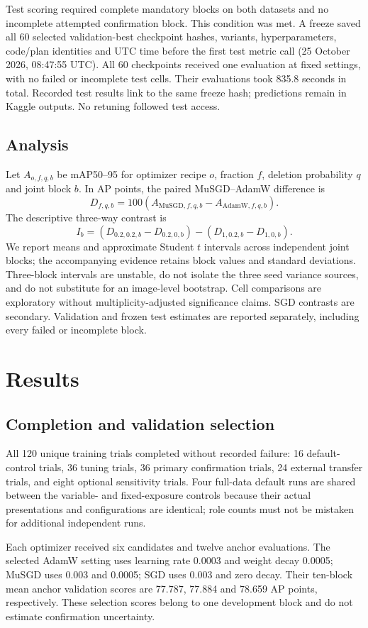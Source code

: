 \documentclass[11pt,a4paper]{article}
\begin{document}
Test scoring required complete mandatory blocks on both datasets and no incomplete attempted confirmation block. This condition was met. A freeze saved all 60 selected validation-best checkpoint hashes, variants, hyperparameters, code/plan identities and UTC time before the first test metric call (25 October 2026, 08:47:55 UTC). All 60 checkpoints received one evaluation at fixed settings, with no failed or incomplete test cells. Their evaluations took 835.8 seconds in total. Recorded test results link to the same freeze hash; predictions remain in Kaggle outputs. No retuning followed test access.

\subsection{Analysis}
Let $A_{o,f,q,b}$ be mAP50--95 for optimizer recipe $o$, fraction $f$, deletion probability $q$ and joint block $b$. In AP points, the paired MuSGD--AdamW difference is
\[
D_{f,q,b}=100(A_{\mathrm{MuSGD},f,q,b}-A_{\mathrm{AdamW},f,q,b}).
\]
The descriptive three-way contrast is
\[
I_b=(D_{0.2,0.2,b}-D_{0.2,0,b})-(D_{1,0.2,b}-D_{1,0,b}).
\]
We report means and approximate Student $t$ intervals across independent joint blocks; the accompanying evidence retains block values and standard deviations. Three-block intervals are unstable, do not isolate the three seed variance sources, and do not substitute for an image-level bootstrap. Cell comparisons are exploratory without multiplicity-adjusted significance claims. SGD contrasts are secondary. Validation and frozen test estimates are reported separately, including every failed or incomplete block.

\section{Results}
\subsection{Completion and validation selection}
All 120 unique training trials completed without recorded failure: 16 default-control trials, 36 tuning trials, 36 primary confirmation trials, 24 external transfer trials, and eight optional sensitivity trials. Four full-data default runs are shared between the variable- and fixed-exposure controls because their actual presentations and configurations are identical; role counts must not be mistaken for additional independent runs.

Each optimizer received six candidates and twelve anchor evaluations. The selected AdamW setting uses learning rate 0.0003 and weight decay 0.0005; MuSGD uses 0.003 and 0.0005; SGD uses 0.003 and zero decay. Their ten-block mean anchor validation scores are 77.787, 77.884 and 78.659 AP points, respectively. These selection scores belong to one development block and do not estimate confirmation uncertainty.
\end{document}
